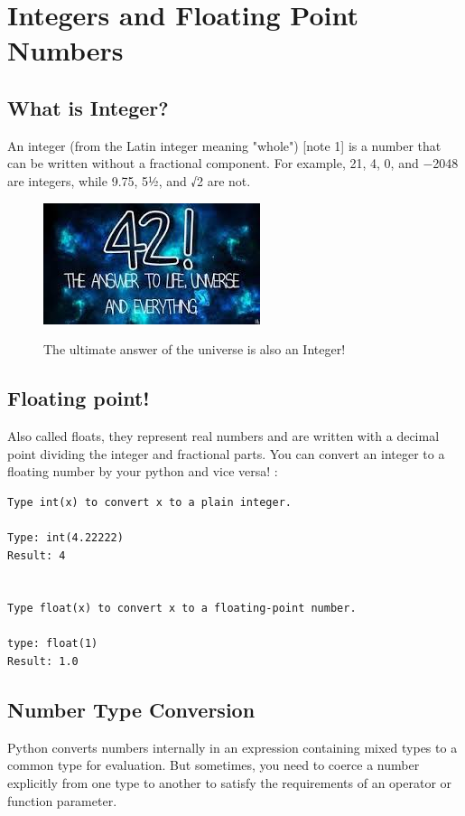 \chapter{Integers and Floating Point Numbers}

\section{What is Integer?}
An integer (from the Latin integer meaning "whole") [note 1] is a number that can be written without a fractional component. For example, 21, 4, 0, and −2048 are integers, while 9.75, 5½, and √2 are not.

\begin{figure}[h!]
\centering
\includegraphics[scale=1.7]{universe.jpg}
\caption{The ultimate answer of the universe is also an Integer!}
\citep{adams1995hitchhiker}
\label{fig:univerise}
\end{figure}

\section{Floating point!}
Also called floats, they represent real numbers and are written with a decimal point dividing the integer and fractional parts. 
You can convert an integer to a floating number by your python and vice versa! :

\begin{verbatim}
Type int(x) to convert x to a plain integer.
                                                                                                            
Type: int(4.22222)
Result: 4


Type float(x) to convert x to a floating-point number.

type: float(1)
Result: 1.0
\end{verbatim}



\section{Number Type Conversion}
Python converts numbers internally in an expression containing mixed types to a common type for evaluation. But sometimes, you need to coerce a number explicitly from one type to another to satisfy the requirements of an operator or function parameter.


